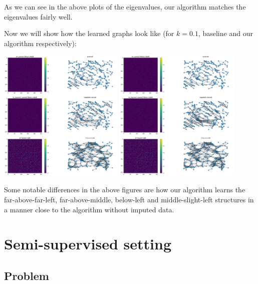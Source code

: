 \documentclass[a4paper]{article}
\begin{document}
As we can see in the above plots of the eigenvalues, our algorithm matches the eigenvalues fairly well.

Now we will show how the learned graphs look like (for $k = 0.1$, baseline and our algorithm respectively):

\begin{center}
    \includegraphics[width=0.45\textwidth]{images/p1/10_percent_baseline_learned_graphs.png}
    \includegraphics[width=0.45\textwidth]{images/p1/10_percent_own_learned_graphs.png}
\end{center}

Some notable differences in the above figures are how our algorithm learns the far-above-far-left, far-above-middle, below-left and middle-slight-left structures in a manner close to the algorithm without imputed data.

\newpage

\section{Semi-supervised setting}

\subsection{Problem}
\end{document}
